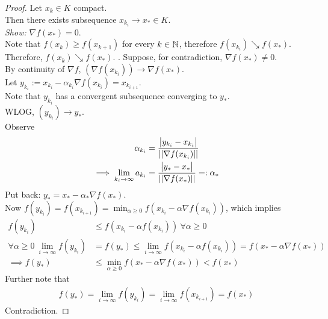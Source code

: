 \documentclass{article}
\begin{document}
	\begin{proof}
		Let $x_k \in K$ compact. \\
		Then there exists subsequence $x_{k_i} \to x_* \in K$. \\
		\emph{Show:} $\nabla f(x_*) = 0$. \\
		Note that $f(x_k) \geq f(x_{k+1})$ for every $k \in \mathbb{N}$, therefore $f(x_{k_i}) \searrow f(x_*)$. Therefore, $f(x_{k}) \searrow f(x_*)$.
		.
		Suppose, for contradiction, $\nabla f(x_*) \neq 0$. \\
		By continuity of $\nabla f$, $(\nabla f(x_{k_i})) \to \nabla f(x_*)$. \\
		Let $y_{k_i} := x_{k_i} - \alpha_{k_i} \nabla f(x_{k_i}) = x_{k_{i+1}}$. \\
		Note that $y_{k_i}$ has a convergent subsequence converging to $y_*$. \\
		WLOG, $(y_{k_i}) \to y_*$. \\
		Observe
		\begin{align}
			\alpha_{k_i} &= \frac{\big \vert {y_{k_i} - x_{k_i}} \big \vert}{\vert \vert {\nabla f(x_{k_i})} \vert \vert} \\
			\implies \lim_{k_i \to \infty} a_{k_i} &= \frac{\big \vert {y_* - x_*} \big \vert}{\vert \vert {\nabla f(x_*)} \vert \vert} =: \alpha_*
		\end{align}
		Put back: $y_* = x_* - \alpha_* \nabla f(x_*)$. \\
		Now $f(y_{k_i}) = f(x_{k_{i+1}}) = \min_{\alpha \geq 0} f(x_{k_i} - \alpha \nabla f(x_{k_i}))$, which implies
		\begin{align}
			f(y_{k_i}) &\leq f(x_{k_i} - \alpha f(x_{k_i}))\ \forall \alpha \geq 0 \\
			\forall \alpha \geq 0\ \lim_{i \to \infty} f(y_{k_i}) &= f(y_*) \leq \lim_{i \to \infty} f(x_{k_i} - \alpha f(x_{k_i})) = f(x_* - \alpha \nabla f(x_*)) \\
			\implies f(y_*) &\leq \min_{\alpha \geq 0} f(x_* - \alpha \nabla f(x_*)) < f(x_*)
		\end{align}
		Further note that 
		\begin{align}
			f(y_*) = \lim_{i \to \infty} f(y_{k_i}) = \lim_{i \to \infty} f(x_{k_{i+1}}) = f(x_*)
		\end{align}
		Contradiction.
	\end{proof}
\end{document}
